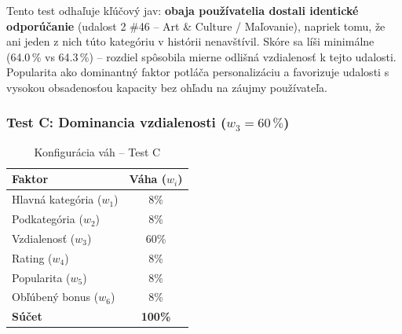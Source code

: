 Tento test odhaľuje kľúčový jav: \textbf{obaja používatelia dostali identické odporúčanie} (udalost 2 \#46 – Art \& Culture / Maľovanie), napriek tomu, že ani jeden z nich túto kategóriu v histórii nenavštívil. Skóre sa líši minimálne (64.0\,\% vs 64.3\,\%) – rozdiel spôsobila mierne odlišná vzdialenosť k tejto udalosti. Popularita ako dominantný faktor potláča personalizáciu a favorizuje udalosti s vysokou obsadenosťou kapacity bez ohľadu na záujmy používateľa.

\subsubsection{Test C: Dominancia vzdialenosti ($w_3 = 60\,\%$)}

\begin{table}[H]
\centering
\caption{Konfigurácia váh – Test C}
\label{tab:vahy_testC}
\begin{tabular}{|l|c|}
\hline
\textbf{Faktor} & \textbf{Váha ($w_i$)} \\ \hline
Hlavná kategória ($w_1$) & 8\% \\
Podkategória ($w_2$)     & 8\% \\
Vzdialenosť ($w_3$)      & 60\% \\
Rating ($w_4$)           & 8\% \\
Popularita ($w_5$)       & 8\% \\
Obľúbený bonus ($w_6$)   & 8\% \\ \hline
\textbf{Súčet}           & \textbf{100\%} \\ \hline
\end{tabular}
\end{table}

